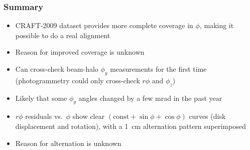 \documentclass[compress]{beamer}
\begin{document}

\begin{frame}
\frametitle{Summary}

\begin{itemize}\setlength{\itemsep}{0.25 cm}
\item CRAFT-2009 dataset provides more complete coverage in $\phi$, making it possible to do a real alignment
\item Reason for improved coverage is unknown
\item Can cross-check beam-halo $\phi_y$ measurements for the first
  time (photogrammetry could only cross-check $r\phi$ and $\phi_z$)
\item Likely that some $\phi_y$ angles changed by a few mrad in the past year
\item $r\phi$ residuals vs.~$\phi$ show clear $(\mbox{const} +
  \sin\phi + \cos\phi)$ curves (disk displacement and rotation), with
  a 1~cm alternation pattern superimposed
\item Reason for alternation is unknown
\end{itemize}

\label{numpages}
\end{frame}
\end{document}
